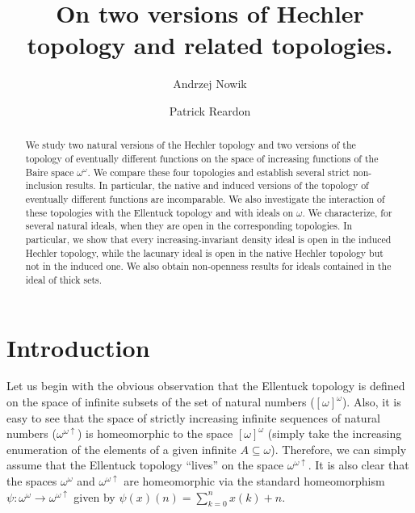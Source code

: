 \documentclass[12pt]{amsart}
\author{Andrzej Nowik}
\author{Patrick Reardon}
\theoremstyle{plain}
\theoremstyle{definition}
\theoremstyle{remark}
\newcommand{\baire}{\omega^{\omega}}
\newcommand{\incrbaire}{\omega^{\omega \uparrow}}
\newcommand{\infsub}{[\omega]^{\omega}}
\begin{document}
\title[
On two versions of Hechler topology and related topologies.
]{
On two versions of Hechler topology and related topologies.
}

\begin{abstract}
  We study two natural versions of the Hechler topology and two versions of the topology of
eventually different functions on the space of increasing functions
of the Baire space $\omega^\omega$.
We compare these four topologies and establish several strict non-inclusion results.
In particular, the native and induced versions of the topology of eventually different functions are incomparable.
We also investigate the interaction of these topologies with the Ellentuck topology and with ideals on $\omega$.
We characterize, for several natural ideals, when they are open in the corresponding topologies.
In particular, we show that every increasing-invariant density ideal is open
in the induced Hechler topology, while the lacunary ideal is open in the native
Hechler topology but not in the induced one.
We also obtain non-openness results for ideals contained in the ideal of thick sets.
\end{abstract}

\maketitle


\section{Introduction}

  Let us begin with the obvious observation that the
  Ellentuck topology is defined on the space of infinite
subsets of the set of natural numbers ($\infsub$).
Also, it is easy to see that the space of strictly increasing
infinite sequences of natural numbers ($\incrbaire$)
is homeomorphic to the space $\infsub$ (simply take
the increasing enumeration of the elements of a given infinite
$A \subseteq \omega$).
  Therefore, we can simply assume that the Ellentuck
topology ``lives'' on the space $\incrbaire$.
It is also clear that the spaces $\baire$ and $\incrbaire$
are homeomorphic via the standard homeomorphism
$\psi \colon \baire \to \incrbaire$
given by
$\psi(x)(n) = \sum_{k = 0}^n x(k) + n$.
\end{document}
